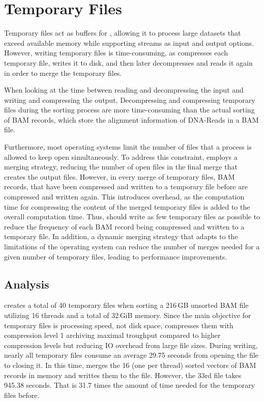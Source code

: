\section{Temporary Files} \label{tempfiles}

Temporary files act as buffers for \sort, allowing it to process large datasets that exceed available memory while supporting streams as input and output options. However, writing temporary files is time-consuming, as \sort compresses each temporary file, writes it to disk, and then later decompresses and reads it again in order to merge the temporary files. 

When looking at the time between reading and decompressing the input and writing and compressing the output, Decompressing and compressing temporary files during the sorting process are more time-consuming than the actual sorting of BAM records, which store the alignment information of DNA-Reads in a BAM file. 

Furthermore, most operating systems limit the number of files that a process is allowed to keep open simultaneously. To address this constraint, \sort employs a merging strategy, reducing the number of open files in the final merge that creates the output files. However, in every merge of temporary files, BAM records, that have been compressed and written to a temporary file before are compressed and written again. This introduces overhead, as the computation time for compressing the content of the merged temporary files is added to the overall computation time. Thus, \sort should write as few temporary files as possible to reduce the frequency of each BAM record being compressed and written to a temporary file. In addition, a dynamic merging strategy that adapts to the limitations of the operating system can reduce the number of merges needed for a given number of temporary files, leading to performance improvements.

\subsection{Analysis}
\sort creates a total of 40 temporary files when sorting a 216\,GB unsorted BAM file utilizing 16 threads and a total of 32\,GiB memory. Since the main objective for temporary files is processing speed, not disk space, \sort compresses them with compression level 1 archiving maximal troughput compared to higher compression levels but reducing IO overhead from large file sizes. During writing, nearly all temporary files consume an average 29.75 seconds from opening the file to closing it. In this time, \sort merges the 16 (one per thread) sorted vectors of BAM records in memory and writtes them to the file. However, the 33rd file takes 945.38 seconds. That is 31.7 times the amount of time needed for the temporary files before.  

